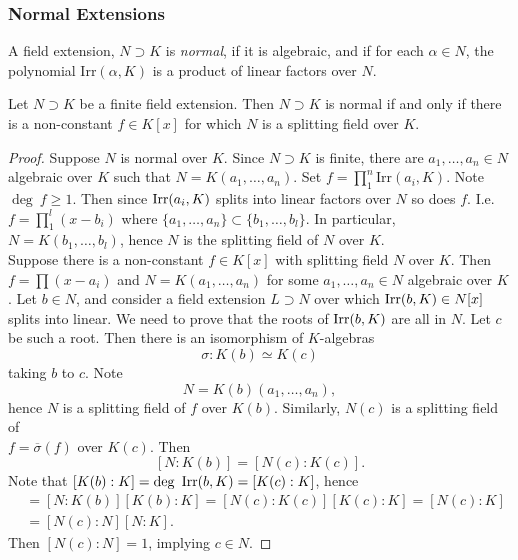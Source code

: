 \subsubsection{Normal Extensions}
\begin{definition}
    A field extension, $N\supset K$ is \emph{normal}, if it is algebraic, and if for each $\alpha \in N$, the polynomial $\mathrm{Irr}(\alpha,K)$ is a product of linear factors over $N$.  
\end{definition}
\begin{lemma}\label{EquivalentFormulationOfNormalExtensionForFiniteExtension}
    Let $N\supset K$ be a finite field extension. Then $N\supset K$ is normal if and only if there is a non-constant $f\in K[x]$ for which $N$ is a splitting field over $K$. 
\end{lemma}
\begin{proof}
    Suppose $N$ is normal over $K$. Since $N\supset K$ is finite, there are $a_1,\dots,a_n\in N$ algebraic over $K$ such that $N = K(a_1,\dots, a_n)$. Set $f = \prod_1^n\mathrm{Irr}(a_i,K)$. Note $\deg \ f \geq 1$. Then since $\mathrm{Irr}(a_i,K)$ splits into linear factors over $N$ so does $f$. I.e. $f = \prod_1^l (x-b_i)$ where $\{a_1,\dots,a_n\}\subset \{b_1,\dots,b_l\}$. In particular, $N = K(b_1,\dots,b_l)$, hence $N$ is the splitting field of $N$ over $K$.\\
    Suppose there is a non-constant $f\in K[x]$ with splitting field $N$ over $K$. Then $f= \prod (x-a_i)$ and $N=K(a_1,\dots,a_n)$ for some $a_1,\dots,a_n\in N$ algebraic over $K$. Let $b\in N$, and consider a field extension $L\supset N$ over which $\mathrm{Irr}(b,K)\in N[x]$ splits into linear. We need to prove that the roots of $\mathrm{Irr}(b,K)$ are all in $N$. Let $c$ be such a root. Then there is an isomorphism of $K$-algebras
    $$
        \sigma : K(b)\simeq K(c)
    $$
    taking $b$ to $c$. Note
    $$
        N = K(b)(a_1,\dots,a_n),
    $$ 
    hence $N$ is a splitting field of $f$ over $K(b)$. Similarly, $N(c)$ is a splitting field of\\ 
    $f = \overline{\sigma}(f)$ over $K(c)$. Then 
    $$
        [N : K(b)] = [N(c) : K(c)].
    $$
    Note that $[K(b) : K] = \deg \ \mathrm{Irr}(b,K) = [K(c) : K]$, hence 
    \begin{align*}
        [N : K] &= [N : K(b)][K(b) : K] = [N(c) : K(c)][K(c) : K] = [N(c) : K]\\ 
        &= [N(c) : N][N : K].
    \end{align*}
    Then $[N(c) : N]= 1$, implying $c\in N$. 
\end{proof}

